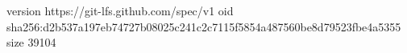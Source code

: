 version https://git-lfs.github.com/spec/v1
oid sha256:d2b537a197eb74727b08025c241c2c7115f5854a487560be8d79523fbe4a5355
size 39104
